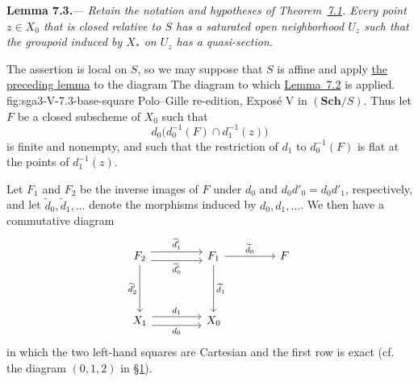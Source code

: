 
\medskip
{}\label{lem:sga3-V-7.3}%
\noindent\textbf{Lemma 7.3.}---%
\emph{Retain the notation and hypotheses of
Theorem~\hyperref[thm:sga3-V-7.1]{7.1}. Every point \(z\in X_0\)
that is closed relative to \(S\) has a saturated open neighborhood
\(U_z\) such that the groupoid induced by \(X_\ast\) on \(U_z\) has
a quasi-section.}

The assertion is local on \(S\), so we may suppose that \(S\) is
affine and apply \hyperref[lem:sga3-V-7.2]{the preceding lemma} to the diagram
  {The diagram to which \hyperref[lem:sga3-V-7.2]{Lemma~7.2} is applied.}
  {fig:sga3-V-7.3-base-square}
  {Polo--Gille re-edition, Expos\'e V}
in \((\mathbf{Sch}/S)\). Thus let \(F\) be a closed subscheme of
\(X_0\) such that
\[
  d_0\bigl(d_0^{-1}(F)\cap d_1^{-1}(z)\bigr)
\]
is finite and nonempty, and such that the restriction of \(d_1\) to
\(d_0^{-1}(F)\) is flat at the points of \(d_1^{-1}(z)\).

Let \(F_1\) and \(F_2\) be the inverse images of \(F\) under \(d_0\)
and \(d_0d'_0=d_0d'_1\), respectively, and let
\(\widetilde d_0,\widetilde d_1,\ldots\) denote the morphisms induced
by \(d_0,d_1,\ldots\). We then have a commutative diagram
\[
\begin{tikzcd}[column sep=4.4em, row sep=4.2em]
F_2
  \arrow[r, shift left=0.9ex, "{\widetilde d'_1}"]
  \arrow[r, shift right=0.9ex, swap, "{\widetilde d'_0}"]
  \arrow[d, swap, "{\widetilde d'_2}"]
&
F_1
  \arrow[r, "{\widetilde d_0}"]
  \arrow[d, "{\widetilde d_1}"]
&
F
\\
X_1
  \arrow[r, shift left=0.9ex, "d_1"]
  \arrow[r, shift right=0.9ex, swap, "d_0"]
&
X_0
&
\end{tikzcd}
\]
in which the two left-hand squares are Cartesian and the first row is
exact (cf. the diagram
\hyperref[sga3:v:lemma:1-2:equation:0-1-2]{\((0,1,2)\)} in \hyperref[sec:sga3-V-1]{\S1}).

